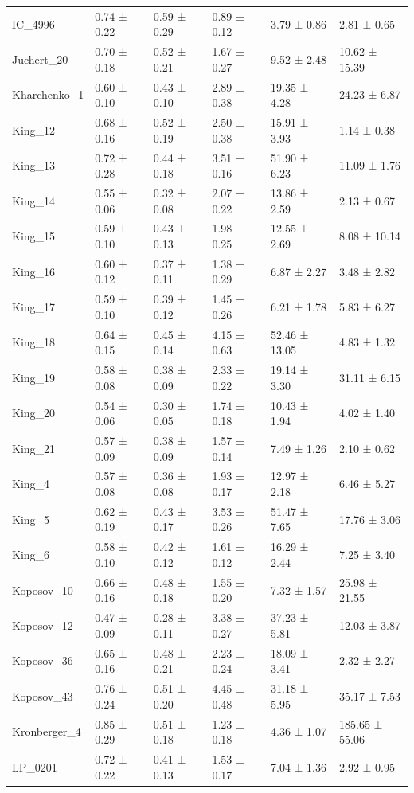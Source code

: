 \begin{tabular}{llllll}
IC_4996 & 0.74 ± 0.22 & 0.59 ± 0.29 & 0.89 ± 0.12 & 3.79 ± 0.86 & 2.81 ± 0.65 \\
Juchert_20 & 0.70 ± 0.18 & 0.52 ± 0.21 & 1.67 ± 0.27 & 9.52 ± 2.48 & 10.62 ± 15.39 \\
Kharchenko_1 & 0.60 ± 0.10 & 0.43 ± 0.10 & 2.89 ± 0.38 & 19.35 ± 4.28 & 24.23 ± 6.87 \\
King_12 & 0.68 ± 0.16 & 0.52 ± 0.19 & 2.50 ± 0.38 & 15.91 ± 3.93 & 1.14 ± 0.38 \\
King_13 & 0.72 ± 0.28 & 0.44 ± 0.18 & 3.51 ± 0.16 & 51.90 ± 6.23 & 11.09 ± 1.76 \\
King_14 & 0.55 ± 0.06 & 0.32 ± 0.08 & 2.07 ± 0.22 & 13.86 ± 2.59 & 2.13 ± 0.67 \\
King_15 & 0.59 ± 0.10 & 0.43 ± 0.13 & 1.98 ± 0.25 & 12.55 ± 2.69 & 8.08 ± 10.14 \\
King_16 & 0.60 ± 0.12 & 0.37 ± 0.11 & 1.38 ± 0.29 & 6.87 ± 2.27 & 3.48 ± 2.82 \\
King_17 & 0.59 ± 0.10 & 0.39 ± 0.12 & 1.45 ± 0.26 & 6.21 ± 1.78 & 5.83 ± 6.27 \\
King_18 & 0.64 ± 0.15 & 0.45 ± 0.14 & 4.15 ± 0.63 & 52.46 ± 13.05 & 4.83 ± 1.32 \\
King_19 & 0.58 ± 0.08 & 0.38 ± 0.09 & 2.33 ± 0.22 & 19.14 ± 3.30 & 31.11 ± 6.15 \\
King_20 & 0.54 ± 0.06 & 0.30 ± 0.05 & 1.74 ± 0.18 & 10.43 ± 1.94 & 4.02 ± 1.40 \\
King_21 & 0.57 ± 0.09 & 0.38 ± 0.09 & 1.57 ± 0.14 & 7.49 ± 1.26 & 2.10 ± 0.62 \\
King_4 & 0.57 ± 0.08 & 0.36 ± 0.08 & 1.93 ± 0.17 & 12.97 ± 2.18 & 6.46 ± 5.27 \\
King_5 & 0.62 ± 0.19 & 0.43 ± 0.17 & 3.53 ± 0.26 & 51.47 ± 7.65 & 17.76 ± 3.06 \\
King_6 & 0.58 ± 0.10 & 0.42 ± 0.12 & 1.61 ± 0.12 & 16.29 ± 2.44 & 7.25 ± 3.40 \\
Koposov_10 & 0.66 ± 0.16 & 0.48 ± 0.18 & 1.55 ± 0.20 & 7.32 ± 1.57 & 25.98 ± 21.55 \\
Koposov_12 & 0.47 ± 0.09 & 0.28 ± 0.11 & 3.38 ± 0.27 & 37.23 ± 5.81 & 12.03 ± 3.87 \\
Koposov_36 & 0.65 ± 0.16 & 0.48 ± 0.21 & 2.23 ± 0.24 & 18.09 ± 3.41 & 2.32 ± 2.27 \\
Koposov_43 & 0.76 ± 0.24 & 0.51 ± 0.20 & 4.45 ± 0.48 & 31.18 ± 5.95 & 35.17 ± 7.53 \\
Kronberger_4 & 0.85 ± 0.29 & 0.51 ± 0.18 & 1.23 ± 0.18 & 4.36 ± 1.07 & 185.65 ± 55.06 \\
LP_0201 & 0.72 ± 0.22 & 0.41 ± 0.13 & 1.53 ± 0.17 & 7.04 ± 1.36 & 2.92 ± 0.95 \\

\end{tabular}
